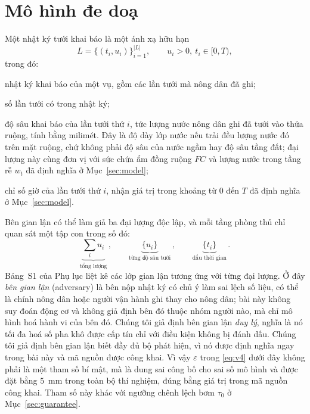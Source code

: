 \section{Mô hình đe doạ}
\label{sec:threat}

Một nhật ký tưới khai báo là một ánh xạ hữu hạn
\begin{equation}
L=\{(t_i,u_i)\}_{i=1}^{|L|},\qquad u_i>0,\ t_i\in[0,T),
\label{eq:log}
\end{equation}
trong đó:
\begin{symbolist}
\item[$L$] nhật ký khai báo của một vụ, gồm các lần tưới mà nông dân đã ghi;
\item[$|L|$] số lần tưới có trong nhật ký;
\item[$u_i$] độ sâu khai báo của lần tưới thứ $i$, tức lượng nước nông dân ghi đã
  tưới vào thửa ruộng, tính bằng milimét. Đây là độ dày lớp nước nếu trải đều lượng
  nước đó trên mặt ruộng, chứ không phải độ sâu của nước ngầm hay độ sâu tầng đất;
  đại lượng này cùng đơn vị với sức chứa ẩm đồng ruộng $FC$ và lượng nước trong tầng
  rễ $w_t$ đã định nghĩa ở Mục~\ref{sec:model};
\item[$t_i$] chỉ số giờ của lần tưới thứ $i$, nhận giá trị trong khoảng từ 0 đến
  $T$ đã định nghĩa ở Mục~\ref{sec:model}.
\end{symbolist}
Bên gian lận có thể làm giả ba đại lượng độc lập, và mỗi tầng phòng thủ chỉ quan sát
một tập con trong số đó:
\begin{equation}
\underbrace{\textstyle\sum_i u_i}_{\text{tổng lượng}}\,,\qquad
\underbrace{\{u_i\}}_{\text{từng độ sâu tưới}}\,,\qquad
\underbrace{\{t_i\}}_{\text{dấu thời gian}}\,.
\label{eq:three}
\end{equation}
Bảng~S1 của Phụ lục liệt kê các lớp gian lận tương ứng với từng đại lượng. Ở đây \emph{bên gian lận} (adversary) là bên nộp nhật ký có chủ ý làm sai lệch số liệu,
có thể là chính nông dân hoặc người vận hành ghi thay cho nông dân; bài này không suy
đoán động cơ và không giả định bên đó thuộc nhóm người nào, mà chỉ mô hình hoá hành vi
của bên đó. Chúng tôi giả định bên gian lận \emph{duy lý}, nghĩa là nó tối đa hoá
số pha khô được cấp tín chỉ với điều kiện không bị đánh dấu. Chúng tôi giả định bên gian lận biết đầy đủ bộ phát hiện, vì nó được định nghĩa ngay
trong bài này và mã nguồn được công khai. Vì vậy
$\varepsilon$ trong \eqref{eq:v4} dưới đây không phải là một tham số bí mật, mà
là dung sai công bố cho sai số mô hình và được đặt bằng $5$~mm trong toàn bộ thí
nghiệm, đúng bằng giá trị trong mã nguồn công khai. Tham số này khác với ngưỡng
chênh lệch bơm $\tau_0$ ở Mục~\ref{sec:guarantee}.

